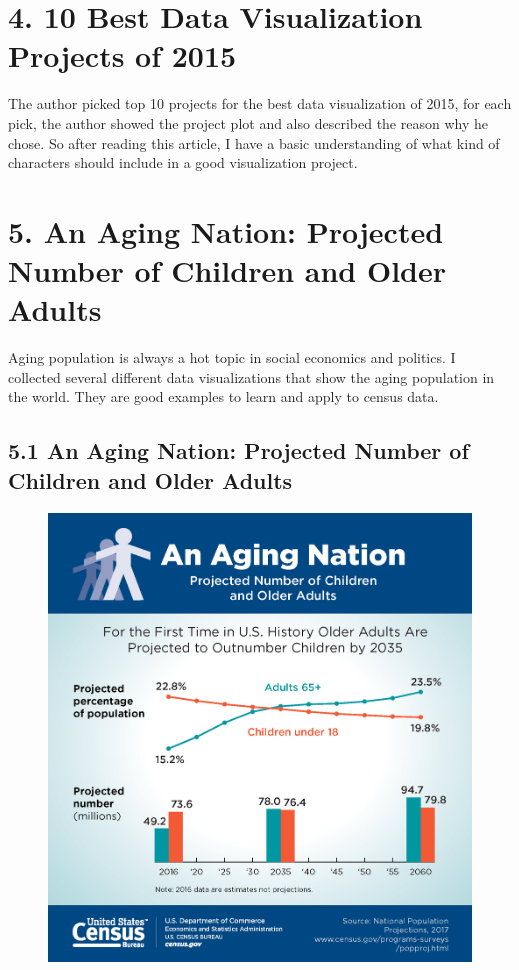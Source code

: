 \documentclass[]{book}
\theoremstyle{definition}
\theoremstyle{definition}
\theoremstyle{definition}
\theoremstyle{remark}
\begin{document}
\section{\texorpdfstring{4. 10 Best Data Visualization Projects of 2015
\citep{10_BEST}}{4. 10 Best Data Visualization Projects of 2015 {[}@10\_BEST{]}}}\label{best-data-visualization-projects-of-2015-10_best-1}

The author picked top 10 projects for the best data visualization of
2015, for each pick, the author showed the project plot and also
described the reason why he chose. So after reading this article, I have
a basic understanding of what kind of characters should include in a
good visualization project.

\section{5. An Aging Nation: Projected Number of Children and Older
Adults}\label{an-aging-nation-projected-number-of-children-and-older-adults-2}

Aging population is always a hot topic in social economics and politics.
I collected several different data visualizations that show the aging
population in the world. They are good examples to learn and apply to
census data.

\subsection{5.1 An Aging Nation: Projected Number of Children and Older
Adults}\label{an-aging-nation-projected-number-of-children-and-older-adults-3}

\begin{figure}
\centering
\includegraphics{images/aging_nation.jpg}
\caption{}
\end{figure}
\end{document}
